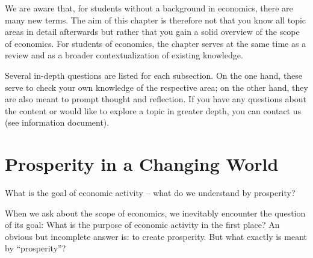\documentclass[
  british,
  a4paper,
  DIV=11,
  numbers=noendperiod,
  oneside,
  openany]{scrreprt}
\begin{document}
We are aware that, for students without a background in economics, there
are many new terms. The aim of this chapter is therefore not that you
know all topic areas in detail afterwards but rather that you gain a
solid overview of the scope of economics. For students of economics, the
chapter serves at the same time as a review and as a broader
contextualization of existing knowledge.

\begin{tcolorbox}[enhanced jigsaw, arc=.35mm, bottomrule=.15mm, bottomtitle=1mm, breakable, colback=white, colbacktitle=quarto-callout-caution-color!10!white, colframe=quarto-callout-caution-color-frame, coltitle=black, left=2mm, leftrule=.75mm, opacityback=0, opacitybacktitle=0.6, rightrule=.15mm, title={In-depth questions}, titlerule=0mm, toprule=.15mm, toptitle=1mm]

Several in-depth questions are listed for each subsection. On the one
hand, these serve to check your own knowledge of the respective area; on
the other hand, they are also meant to prompt thought and reflection. If
you have any questions about the content or would like to explore a
topic in greater depth, you can contact us (see information document).

\end{tcolorbox}

\section{Prosperity in a Changing
World}\label{prosperity-in-a-changing-world}

\begin{tcolorbox}[enhanced jigsaw, arc=.35mm, bottomrule=.15mm, bottomtitle=1mm, breakable, colback=white, colbacktitle=quarto-callout-note-color!10!white, colframe=quarto-callout-note-color-frame, coltitle=black, left=2mm, leftrule=.75mm, opacityback=0, opacitybacktitle=0.6, rightrule=.15mm, title={Guiding question}, titlerule=0mm, toprule=.15mm, toptitle=1mm]

What is the goal of economic activity -- what do we understand by
prosperity?

\end{tcolorbox}

When we ask about the scope of economics, we inevitably encounter the
question of its goal: What is the purpose of economic activity in the
first place? An obvious but incomplete answer is: to create prosperity.
But what exactly is meant by ``prosperity''?
\end{document}
